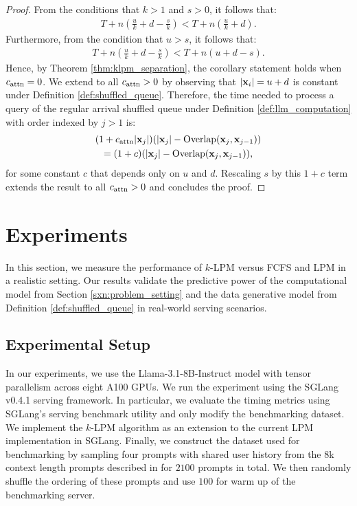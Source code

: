 \begin{proof}

From the conditions that $k > 1$ and $s > 0$, it follows that:
\begin{gather*}
     T + n(\frac{u}{k} + d - \frac{s}{k}) < T + n(\frac{u}{k} + d).
\end{gather*}
Furthermore, from the condition that $u > s$, it follows that:
\begin{gather*}
    T + n(\frac{u}{k} + d - \frac{s}{k}) < T + n(u + d - s).
\end{gather*}
Hence, by Theorem \ref{thm:klpm_separation}, the corollary statement holds when $c_{\mathrm{attn}}=0$. We extend to all $c_{\mathrm{attn}} > 0$ by observing that $|\mathbf{x}_i| = u + d$ is constant under Definition \ref{def:shuffled_queue}. Therefore, the time needed to process a query of the regular arrival shuffled queue under Definition \ref{def:llm_computation} with order indexed by $j > 1$ is:
\begin{gather*}
    (1 + c_{\mathrm{attn}}|\mathbf{x}_j|)(|\mathbf{x}_j| - \operatorname{Overlap}(\mathbf{x}_j, \mathbf{x}_{j-1}))
    \\= (1 + c)(|\mathbf{x}_j| - \operatorname{Overlap}(\mathbf{x}_j, \mathbf{x}_{j-1})),
\end{gather*}
for some constant $c$ that depends only on $u$ and $d$. Rescaling $s$ by this $1 + c$ term extends the result to all $c_{\mathrm{attn}} > 0$ and concludes the proof.

\end{proof}


\section{Experiments}\label{sxn:experiments}

In this section, we measure the performance of $k$-LPM versus FCFS and LPM in a realistic setting. Our results validate the predictive power of the computational model from Section \ref{sxn:problem_setting} and the data generative model from Definition \ref{def:shuffled_queue} in real-world serving scenarios. 


\subsection{Experimental Setup}

In our experiments, we use the Llama-3.1-8B-Instruct model \cite{dubey2024llama} with tensor parallelism across eight A100 GPUs. We run the experiment using the SGLang v0.4.1 serving framework. In particular, we evaluate the timing metrics using SGLang's serving benchmark utility \cite{sglang_bench_serving} and only modify the benchmarking dataset. We implement the $k$-LPM algorithm as an extension to the current LPM implementation in SGLang. Finally, we construct the dataset used for benchmarking by sampling four prompts with shared user history from the 8k context length prompts described in \cite{360brew} for $2100$ prompts in total. We then randomly shuffle the ordering of these prompts and use $100$ for warm up of the benchmarking server.

